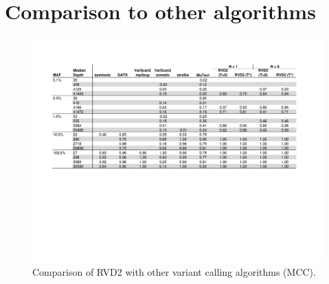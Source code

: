 \documentclass[11pt,reqno]{amsart}
\begin{document}
\section{Comparison to other algorithms}\label{sec:app_comparison}
\begin{figure}[h]
\begin{center}
\includegraphics[width=140mm]{pdf_figs/comparison_table_mcc.pdf}
\caption{Comparison of RVD2 with other variant calling algorithms (MCC).}
\label{fig:comparison_mcc}
\end{center}
\end{figure}




\end{document}
